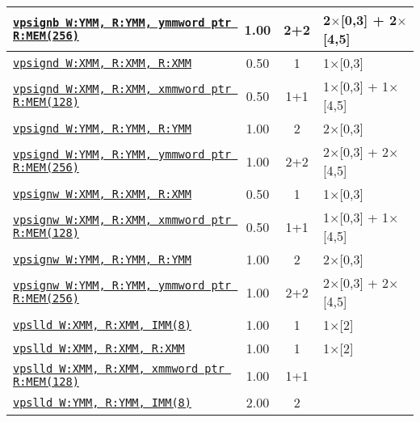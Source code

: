 \documentclass[a4paper,english,fontsize=9]{scrartcl}
\begin{document}
\begin{longtable}{p{}ccL{.25\textwidth}}
  \midrule
  \texttt{\href{https://felixcloutier.com/x86/PSIGNB:PSIGNW:PSIGND.html}{vpsignb W:YMM, R:YMM, ymmword ptr R:MEM(256)}} & 1.00 & 2+2 & 2\(\times\)[0,3] + 2\(\times\)[4,5] \\
  \midrule
  \texttt{\href{https://felixcloutier.com/x86/PSIGNB:PSIGNW:PSIGND.html}{vpsignd W:XMM, R:XMM, R:XMM}} & 0.50 & 1 & 1\(\times\)[0,3] \\
  \midrule
  \texttt{\href{https://felixcloutier.com/x86/PSIGNB:PSIGNW:PSIGND.html}{vpsignd W:XMM, R:XMM, xmmword ptr R:MEM(128)}} & 0.50 & 1+1 & 1\(\times\)[0,3] + 1\(\times\)[4,5] \\
  \midrule
  \texttt{\href{https://felixcloutier.com/x86/PSIGNB:PSIGNW:PSIGND.html}{vpsignd W:YMM, R:YMM, R:YMM}} & 1.00 & 2 & 2\(\times\)[0,3] \\
  \midrule
  \texttt{\href{https://felixcloutier.com/x86/PSIGNB:PSIGNW:PSIGND.html}{vpsignd W:YMM, R:YMM, ymmword ptr R:MEM(256)}} & 1.00 & 2+2 & 2\(\times\)[0,3] + 2\(\times\)[4,5] \\
  \midrule
  \texttt{\href{https://felixcloutier.com/x86/PSIGNB:PSIGNW:PSIGND.html}{vpsignw W:XMM, R:XMM, R:XMM}} & 0.50 & 1 & 1\(\times\)[0,3] \\
  \midrule
  \texttt{\href{https://felixcloutier.com/x86/PSIGNB:PSIGNW:PSIGND.html}{vpsignw W:XMM, R:XMM, xmmword ptr R:MEM(128)}} & 0.50 & 1+1 & 1\(\times\)[0,3] + 1\(\times\)[4,5] \\
  \midrule
  \texttt{\href{https://felixcloutier.com/x86/PSIGNB:PSIGNW:PSIGND.html}{vpsignw W:YMM, R:YMM, R:YMM}} & 1.00 & 2 & 2\(\times\)[0,3] \\
  \midrule
  \texttt{\href{https://felixcloutier.com/x86/PSIGNB:PSIGNW:PSIGND.html}{vpsignw W:YMM, R:YMM, ymmword ptr R:MEM(256)}} & 1.00 & 2+2 & 2\(\times\)[0,3] + 2\(\times\)[4,5] \\
  \midrule
  \texttt{\href{https://felixcloutier.com/x86/PSLLW:PSLLD:PSLLQ.html}{vpslld W:XMM, R:XMM, IMM(8)}} & 1.00 & 1 & 1\(\times\)[2] \\
  \midrule
  \texttt{\href{https://felixcloutier.com/x86/PSLLW:PSLLD:PSLLQ.html}{vpslld W:XMM, R:XMM, R:XMM}} & 1.00 & 1 & 1\(\times\)[2] \\
  \midrule
  \texttt{\href{https://felixcloutier.com/x86/PSLLW:PSLLD:PSLLQ.html}{vpslld W:XMM, R:XMM, xmmword ptr R:MEM(128)}} & 1.00 & 1+1 &  \\
  \midrule
  \texttt{\href{https://felixcloutier.com/x86/PSLLW:PSLLD:PSLLQ.html}{vpslld W:YMM, R:YMM, IMM(8)}} & 2.00 & 2 &  \\
  \midrule

\end{longtable}
\end{document}
